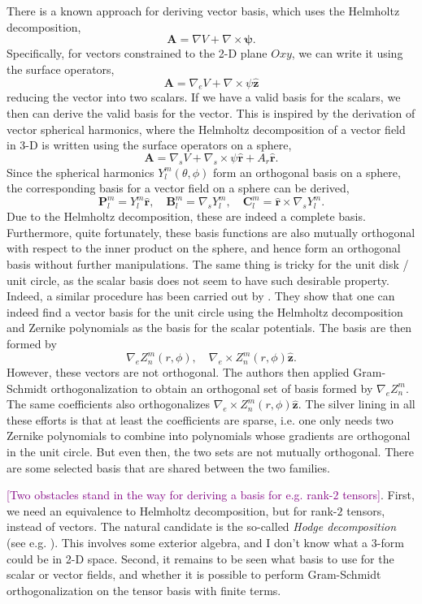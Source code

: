 \documentclass[a4paper, 11pt]{article}
\newcommand{\todoitem}[1]{\textcolor{purple}{[#1]}}
\begin{document}
There is a known approach for deriving vector basis, which uses the Helmholtz decomposition,
\begin{equation}
    \mathbf{A} = \nabla V + \nabla \times \bm{\psi}.
\end{equation}
Specifically, for vectors constrained to the 2-D plane $Oxy$, we can write it using the surface operators,
\begin{equation}
    \mathbf{A} = \nabla_e V + \nabla \times \psi \hat{\mathbf{z}}
\end{equation}
reducing the vector into two scalars. If we have a valid basis for the scalars, we then can derive the valid basis for the vector. This is inspired by the derivation of vector spherical harmonics, where the Helmholtz decomposition of a vector field in 3-D is written using the surface operators on a sphere,
\[
    \mathbf{A} = \nabla_s V + \nabla_s \times \psi \hat{\mathbf{r}} + A_r \hat{\mathbf{r}}.
\]
Since the spherical harmonics $Y_l^m(\theta, \phi)$ form an orthogonal basis on a sphere, the corresponding basis for a vector field on a sphere can be derived,
\[
    \mathbf{P}_l^m = Y_l^m \hat{\mathbf{r}},\quad \mathbf{B}_l^m = \nabla_s Y_l^m,\quad \mathbf{C}_l^m = \hat{\mathbf{r}} \times \nabla_s Y_l^m.
\]
Due to the Helmholtz decomposition, these are indeed a complete basis. Furthermore, quite fortunately, these basis functions are also mutually orthogonal with respect to the inner product on the sphere, and hence form an orthogonal basis without further manipulations. The same thing is tricky for the unit disk / unit circle, as the scalar basis does not seem to have such desirable property. Indeed, a similar procedure has been carried out by \textcite{zhao_orthonormal_2007, zhao_orthonormal_2008}. They show that one can indeed find a vector basis for the unit circle using the Helmholtz decomposition and Zernike polynomials as the basis for the scalar potentials. The basis are then formed by
\[
    \nabla_e Z_n^m (r, \phi),\quad \nabla_e \times Z_n^m(r, \phi) \hat{\mathbf{z}}.
\]
However, these vectors are not orthogonal. The authors then applied Gram-Schmidt orthogonalization to obtain an orthogonal set of basis formed by $\nabla_e Z_n^m$. The same coefficients also orthogonalizes $\nabla_e \times Z_n^m(r,\phi) \hat{\mathbf{z}}$. The silver lining in all these efforts is that at least the coefficients are sparse, i.e. one only needs two Zernike polynomials to combine into polynomials whose gradients are orthogonal in the unit circle. But even then, the two sets are not mutually orthogonal. There are some selected basis that are shared between the two families.

\todoitem{Two obstacles stand in the way for deriving a basis for e.g. rank-$2$ tensors}. First, we need an equivalence to Helmholtz decomposition, but for rank-$2$ tensors, instead of vectors. The natural candidate is the so-called \textit{Hodge decomposition} (see e.g. \cite{bhatia_helmholtz-hodge_2013}). This involves some exterior algebra, and I don't know what a $3$-form could be in 2-D space. Second, it remains to be seen what basis to use for the scalar or vector fields, and whether it is possible to perform Gram-Schmidt orthogonalization on the tensor basis with finite terms.

\printbibliography
\end{document}
